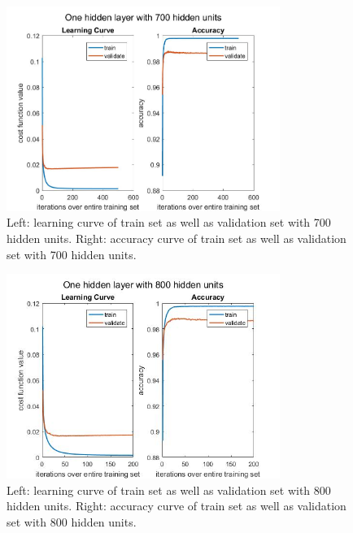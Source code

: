 \documentclass[conference]{IEEEtran}
\begin{document}


\begin{figure}[htbp]
\centerline{\includegraphics[width=3.5in]{LCAC700unitsPCA100eta.jpg}}
\caption{Left: learning curve of train set as well as validation set with 700 hidden units. Right: accuracy curve of train set as well as validation set with 700 hidden units.}
\label{1hidden700}
\end{figure}

\begin{figure}[h!]
\centerline{\includegraphics[width=3.5in]{LCAC800.jpg}}
\caption{Left: learning curve of train set as well as validation set with 800 hidden units. Right: accuracy curve of train set as well as validation set with 800 hidden units.}
\label{1hidden800}
\end{figure}
\end{document}
